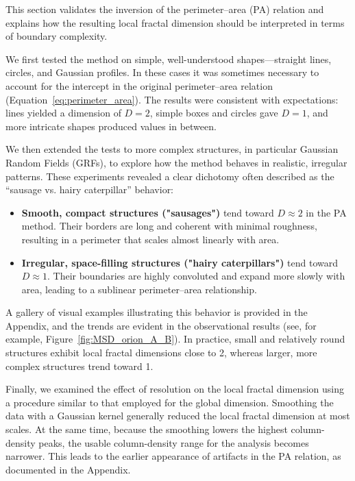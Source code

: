 This section validates the inversion of the perimeter–area (PA) relation and explains how the resulting local fractal dimension should be interpreted in terms of boundary complexity.

We first tested the method on simple, well-understood shapes—straight lines, circles, and Gaussian profiles.  
In these cases it was sometimes necessary to account for the intercept in the original perimeter–area relation (Equation~\ref{eq:perimeter_area}).  
The results were consistent with expectations: lines yielded a dimension of \(D = 2\), simple boxes and circles gave \(D = 1\), and more intricate shapes produced values in between.

We then extended the tests to more complex structures, in particular Gaussian Random Fields (GRFs), to explore how the method behaves in realistic, irregular patterns.  
These experiments revealed a clear dichotomy often described as the “sausage vs. hairy caterpillar” behavior:
\begin{itemize}
    \item \textbf{Smooth, compact structures ("sausages")} tend toward \(D \approx 2\) in the PA method. Their borders are long and coherent with minimal roughness, resulting in a perimeter that scales almost linearly with area.
    \item \textbf{Irregular, space-filling structures ("hairy caterpillars")} tend toward \(D \approx 1\). Their boundaries are highly convoluted and expand more slowly with area, leading to a sublinear perimeter–area relationship.
\end{itemize}

A gallery of visual examples illustrating this behavior is provided in the Appendix, and the trends are evident in the observational results (see, for example, Figure~\ref{fig:MSD_orion_A_B}).  
In practice, small and relatively round structures exhibit local fractal dimensions close to 2, whereas larger, more complex structures trend toward 1.

Finally, we examined the effect of resolution on the local fractal dimension using a procedure similar to that employed for the global dimension.  
Smoothing the data with a Gaussian kernel generally reduced the local fractal dimension at most scales.  
At the same time, because the smoothing lowers the highest column-density peaks, the usable column-density range for the analysis becomes narrower.  
This leads to the earlier appearance of artifacts in the PA relation, as documented in the Appendix.

